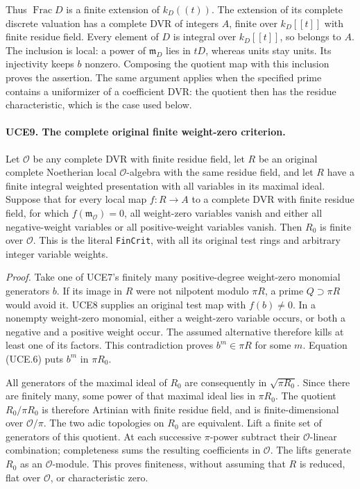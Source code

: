 Thus \(\operatorname{Frac}D\) is a finite extension of
\(k_D((t))\).  The extension of its complete discrete valuation
has a complete DVR of integers \(A\), finite over \(k_D[[t]]\)
with finite residue field.  Every element of \(D\) is integral
over \(k_D[[t]]\), so belongs to \(A\).  The inclusion is local:
a power of \(\mathfrak m_D\) lies in \(tD\), whereas units
stay units.  Its injectivity keeps \(b\) nonzero.  Composing the
quotient map with this inclusion proves the assertion.  The same
argument applies when the specified prime contains a uniformizer
of a coefficient DVR: the quotient then has the residue
characteristic, which is the case used below.

\paragraph{UCE9. The complete original finite weight-zero criterion.}
\label{claim:UCE9}
Let \(\mathcal O\) be any complete DVR with finite residue field,
let \(R\) be an original complete Noetherian local
\(\mathcal O\)-algebra with the same residue field, and let
\(R\) have a finite integral weighted presentation with all
variables in its maximal ideal.  Suppose that for every local map
\(f:R\to A\) to a complete DVR with finite residue field, for
which \(f(\mathfrak m_{\mathcal O})=0\), all weight-zero
variables vanish and either all negative-weight variables or all
positive-weight variables vanish.  Then \(R_0\) is finite over
\(\mathcal O\).  This is the literal \texttt{FinCrit}, with all
its original test rings and arbitrary integer variable weights.

\emph{Proof.}
Take one of UCE7's finitely many positive-degree weight-zero
monomial generators \(b\).  If its image in \(R\) were not
nilpotent modulo \(\pi R\), a prime \(Q\supset\pi R\)
would avoid it.  UCE8 supplies an original test map with
\(f(b)\ne0\).  In a nonempty weight-zero monomial, either a
weight-zero variable occurs, or both a negative and a positive
weight occur.  The assumed alternative therefore kills at least
one of its factors.  This contradiction proves
\(b^m\in\pi R\) for some \(m\).
Equation (UCE.6) puts \(b^m\) in \(\pi R_0\).

All generators of the maximal ideal of \(R_0\) are consequently
in \(\sqrt{\pi R_0}\).  Since there are finitely many, some
power of that maximal ideal lies in \(\pi R_0\).  The quotient
\(R_0/\pi R_0\) is therefore Artinian with finite residue field,
and is finite-dimensional over \(\mathcal O/\pi\).
The two adic topologies on \(R_0\) are equivalent.  Lift a finite
set of generators of this quotient.  At each successive
\(\pi\)-power subtract their \(\mathcal O\)-linear combination;
completeness sums the resulting coefficients in \(\mathcal O\).
The lifts generate \(R_0\) as an \(\mathcal O\)-module.
This proves finiteness, without assuming that \(R\) is reduced,
flat over \(\mathcal O\), or characteristic zero.

